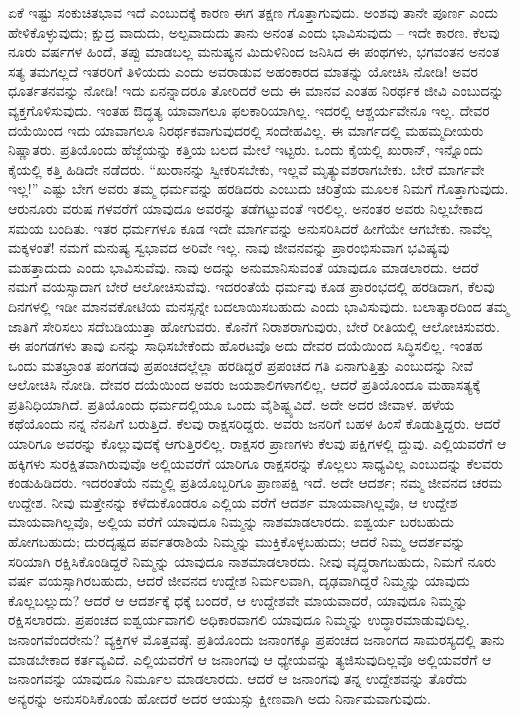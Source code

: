 ಏಕೆ ಇಷ್ಟು ಸಂಕುಚಿತಭಾವ ಇದೆ ಎಂಬುದಕ್ಕೆ ಕಾರಣ ಈಗ ತಕ್ಷಣ ಗೊತ್ತಾಗುವುದು. ಅಂಶವು ತಾನೇ ಪೂರ್ಣ ಎಂದು ಹೇಳಿಕೊಳ್ಳುವುದು; ಕ್ಷುದ್ರ ವಾದುದು, ಅಲ್ಪವಾದುದು ತಾನು ಅನಂತ ಎಂದು ಭಾವಿಸುವುದು – ಇದೇ ಕಾರಣ. ಕೆಲವು ನೂರು ವರ್ಷಗಳ ಹಿಂದೆ, ತಪ್ಪು ಮಾಡಬಲ್ಲ ಮನುಷ್ಯನ ಮಿದುಳಿನಿಂದ ಜನಿಸಿದ ಈ ಪಂಥಗಳು, ಭಗವಂತನ ಅನಂತ ಸತ್ಯ ತಮಗಲ್ಲದೆ ಇತರರಿಗೆ ತಿಳಿಯದು ಎಂದು ಅವರಾಡುವ ಅಹಂಕಾರದ ಮಾತನ್ನು ಯೋಚಿಸಿ ನೋಡಿ! ಅವರ ಧೂರ್ತತನವನ್ನು ನೋಡಿ! ಇದು ಏನನ್ನಾದರೂ ತೋರಿದರೆ ಅದು ಈ ಮಾನವ ಎಂತಹ ನಿರರ್ಥಕ ಜೀವಿ ಎಂಬುದನ್ನು ವ್ಯಕ್ತಗೊಳಿಸುವುದು. ಇಂತಹ ಔದ್ಧತ್ಯ ಯಾವಾಗಲೂ ಫಲಕಾರಿಯಾಗಿಲ್ಲ. ಇದರಲ್ಲಿ ಆಶ್ಚರ್ಯವೇನೂ ಇಲ್ಲ. ದೇವರ ದಯೆಯಿಂದ ಇದು ಯಾವಾಗಲೂ ನಿರರ್ಥಕವಾಗುವುದರಲ್ಲಿ ಸಂದೇಹವಿಲ್ಲ. ಈ ಮಾರ್ಗದಲ್ಲಿ ಮಹಮ್ಮದೀಯರು ನಿಷ್ಣಾತರು. ಪ್ರತಿಯೊಂದು ಹೆಜ್ಜೆಯನ್ನು ಕತ್ತಿಯ ಬಲದ ಮೇಲೆ ಇಟ್ಟರು. ಒಂದು ಕೈಯಲ್ಲಿ ಖುರಾನ್​, ಇನ್ನೊಂದು ಕೈಯಲ್ಲಿ ಕತ್ತಿ ಹಿಡಿದೇ ನಡೆದರು. “ಖುರಾನನ್ನು ಸ್ವೀಕರಿಸಬೇಕು, ಇಲ್ಲವೆ ಮೃತ್ಯುವಶರಾಗಬೇಕು. ಬೇರೆ ಮಾರ್ಗವೇ ಇಲ್ಲ!” ಎಷ್ಟು ಬೇಗ ಅವರು ತಮ್ಮ ಧರ್ಮವನ್ನು ಹರಡಿದರು ಎಂಬುದು ಚರಿತ್ರೆಯ ಮೂಲಕ ನಿಮಗೆ ಗೊತ್ತಾಗುವುದು. ಆರುನೂರು ವರುಷ ಗಳವರೆಗೆ ಯಾವುದೂ ಅವರನ್ನು ತಡೆಗಟ್ಟುವಂತೆ ಇರಲಿಲ್ಲ. ಅನಂತರ ಅವರು ನಿಲ್ಲಬೇಕಾದ ಸಮಯ ಬಂದಿತು. ಇತರ ಧರ್ಮಗಳೂ ಕೂಡ ಇದೇ ಮಾರ್ಗವನ್ನು ಅನುಸರಿಸಿದರೆ ಹೀಗೆಯೇ ಆಗಬೇಕು. ನಾವೆಲ್ಲ ಮಕ್ಕಳಂತೆ! ನಮಗೆ ಮನುಷ್ಯ ಸ್ವಭಾವದ ಅರಿವೇ ಇಲ್ಲ. ನಾವು ಜೀವನವನ್ನು ಪ್ರಾರಂಭಿಸುವಾಗ ಭವಿಷ್ಯವು ಮಹತ್ತಾದುದು ಎಂದು ಭಾವಿಸುವೆವು. ನಾವು ಅದನ್ನು ಅನುಮಾನಿಸುವಂತೆ ಯಾವುದೂ ಮಾಡಲಾರದು. ಆದರೆ ನಮಗೆ ವಯಸ್ಸಾದಾಗ ಬೇರೆ ಆಲೋಚಿಸುವೆವು. ಇದರಂತೆಯೆ ಧರ್ಮವು ಕೂಡ ಪ್ರಾರಂಭದಲ್ಲಿ ಹರಡಿದಾಗ, ಕೆಲವು ದಿನಗಳಲ್ಲಿ ಇಡೀ ಮಾನವಕೋಟಿಯ ಮನಸ್ಸನ್ನೇ ಬದಲಾಯಿಸಬಹುದು ಎಂದು ಭಾವಿಸುವುದು. ಬಲಾತ್ಕಾರದಿಂದ ತಮ್ಮ ಜಾತಿಗೆ ಸೇರಿಸಲು ಸದೆಬಡಿಯುತ್ತಾ ಹೋಗುವರು. ಕೊನೆಗೆ ನಿರಾಶರಾಗುವುರು, ಬೇರೆ ರೀತಿಯಲ್ಲಿ ಆಲೋಚಿಸುವರು. ಈ ಪಂಗಡಗಳು ತಾವು ಏನನ್ನು ಸಾಧಿಸಬೇಕೆಂದು ಹೊರಟವೊ ಅದು ದೇವರ ದಯೆಯಿಂದ ಸಿದ್ಧಿಸಲಿಲ್ಲ. ಇಂತಹ ಒಂದು ಮತಭ್ರಾಂತ ಪಂಗಡವು ಪ್ರಪಂಚದಲ್ಲೆಲ್ಲಾ ಹರಡಿದ್ದರೆ ಪ್ರಪಂಚದ ಗತಿ ಏನಾಗುತ್ತಿತ್ತು ಎಂಬುದನ್ನು ನೀವೆ ಆಲೋಚಿಸಿ ನೋಡಿ. ದೇವರ ದಯೆಯಿಂದ ಅವರು ಜಯಶಾಲಿಗಳಾಗಲಿಲ್ಲ. ಆದರೆ ಪ್ರತಿಯೊಂದೂ ಮಹಾಸತ್ಯಕ್ಕೆ ಪ್ರತಿನಿಧಿಯಾಗಿದೆ. ಪ್ರತಿಯೊಂದು ಧರ್ಮದಲ್ಲಿಯೂ ಒಂದು ವೈಶಿಷ್ಟ್ಯವಿದೆ. ಅದೇ ಅದರ ಜೀವಾಳ. ಹಳೆಯ ಕಥೆಯೊಂದು ನನ್ನ ನೆನಪಿಗೆ ಬರುತ್ತಿದೆ. ಕೆಲವು ರಾಕ್ಷಸರಿದ್ದರು. ಅವರು ಜನರಿಗೆ ಬಹಳ ಹಿಂಸೆ ಕೊಡುತ್ತಿದ್ದರು. ಆದರೆ ಯಾರಿಗೂ ಅವರನ್ನು ಕೊಲ್ಲುವುದಕ್ಕೆ ಆಗುತ್ತಿರಲಿಲ್ಲ. ರಾಕ್ಷಸರ ಪ್ರಾಣಗಳು ಕೆಲವು ಪಕ್ಷಿಗಳಲ್ಲಿ ದ್ದುವು. ಎಲ್ಲಿಯವರೆಗೆ ಆ ಹಕ್ಕಿಗಳು ಸುರಕ್ಷಿತವಾಗಿರುವುವೊ ಅಲ್ಲಿಯವರೆಗೆ ಯಾರಿಗೂ ರಾಕ್ಷಸರನ್ನು ಕೊಲ್ಲಲು ಸಾಧ್ಯವಿಲ್ಲ ಎಂಬುದನ್ನು ಕೆಲವರು ಕಂಡುಹಿಡಿದರು. ಇದರಂತೆಯೆ ನಮ್ಮಲ್ಲಿ ಪ್ರತಿಯೊಬ್ಬರಿಗೂ ಪ್ರಾಣಪಕ್ಷಿ ಇದೆ. ಅದೇ ಆದರ್ಶ; ನಮ್ಮ ಜೀವನದ ಚರಮ ಉದ್ದೇಶ. ನೀವು ಮತ್ತೇನನ್ನು ಕಳೆದುಕೊಂಡರೂ ಎಲ್ಲಿಯ ವರೆಗೆ ಆದರ್ಶ ಮಾಯವಾಗಿಲ್ಲವೊ, ಆ ಉದ್ದೇಶ ಮಾಯವಾಗಿಲ್ಲವೊ, ಅಲ್ಲಿಯ ವರೆಗೆ ಯಾವುದೂ ನಿಮ್ಮನ್ನು ನಾಶಮಾಡಲಾರದು. ಐಶ್ವರ್ಯ ಬರಬಹುದು ಹೋಗಬಹುದು; ದುರದೃಷ್ಟದ ಪರ್ವತರಾಶಿಯೆ ನಿಮ್ಮನ್ನು ಮುಕ್ತಿಕೊಳ್ಳಬಹುದು; ಆದರೆ ನಿಮ್ಮ ಆದರ್ಶವನ್ನು ಸರಿಯಾಗಿ ರಕ್ಷಿಸಿಕೊಂಡಿದ್ದರೆ ನಿಮ್ಮನ್ನು ಯಾವುದೂ ನಾಶಮಾಡಲಾರದು. ನೀವು ವೃದ್ಧರಾಗಬಹುದು, ನಿಮಗೆ ನೂರು ವರ್ಷ ವಯಸ್ಸಾಗಿರಬಹುದು, ಆದರೆ ಜೀವನದ ಉದ್ದೇಶ ನಿರ್ಮಲವಾಗಿ, ದೃಢವಾಗಿದ್ದರೆ ನಿಮ್ಮನ್ನು ಯಾವುದು ಕೊಲ್ಲಬಲ್ಲುದು? ಆದರೆ ಆ ಆದರ್ಶಕ್ಕೆ ಧಕ್ಕೆ ಬಂದರೆ, ಆ ಉದ್ದೇಶವೇ ಮಾಯವಾದರೆ, ಯಾವುದೂ ನಿಮ್ಮನ್ನು ರಕ್ಷಿಸಲಾರದು. ಪ್ರಪಂಚದ ಐಶ್ವರ್ಯವಾಗಲಿ ಅಧಿಕಾರವಾಗಲಿ ಯಾವುದೂ ನಿಮ್ಮನ್ನು ಉದ್ಧಾರಮಾಡುವುದಿಲ್ಲ. ಜನಾಂಗವೆಂದರೇನು? ವ್ಯಕ್ತಿಗಳ ಮೊತ್ತವಷ್ಠೆ. ಪ್ರತಿಯೊಂದು ಜನಾಂಗಕ್ಕೂ ಪ್ರಪಂಚದ ಜನಾಂಗದ ಸಾಮರಸ್ಯದಲ್ಲಿ ತಾನು ಮಾಡಬೇಕಾದ ಕರ್ತವ್ಯವಿದೆ. ಎಲ್ಲಿಯವರೆಗೆ ಆ ಜನಾಂಗವು ಆ ಧ್ಯೇಯವನ್ನು ತ್ಯಜಿಸುವುದಿಲ್ಲವೊ ಅಲ್ಲಿಯವರೆಗೆ ಆ ಜನಾಂಗವನ್ನು ಯಾವುದೂ ನಿರ್ಮೂಲ ಮಾಡಲಾರದು. ಆದರೆ ಆ ಜನಾಂಗವು ತನ್ನ ಉದ್ದೇಶವನ್ನು ತೊರೆದು ಅನ್ಯರನ್ನು ಅನುಸರಿಸಿಕೊಂಡು ಹೋದರೆ ಅದರ ಆಯುಸ್ಸು ಕ್ಷೀಣವಾಗಿ ಅದು ನಿರ್ನಾಮವಾಗುವುದು.

